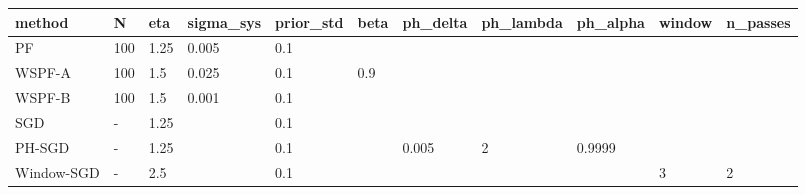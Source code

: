 \begin{tabular}{lllllllllll}
\hline
method & N & eta & sigma\_sys & prior\_std & beta & ph\_delta & ph\_lambda & ph\_alpha & window & n\_passes \\
\hline
PF & 100 & 1.25 & 0.005 & 0.1 &  &  &  &  &  &  \\
WSPF-A & 100 & 1.5 & 0.025 & 0.1 & 0.9 &  &  &  &  &  \\
WSPF-B & 100 & 1.5 & 0.001 & 0.1 &  &  &  &  &  &  \\
SGD & - & 1.25 &  & 0.1 &  &  &  &  &  &  \\
PH-SGD & - & 1.25 &  & 0.1 &  & 0.005 & 2 & 0.9999 &  &  \\
Window-SGD & - & 2.5 &  & 0.1 &  &  &  &  & 3 & 2 \\
\hline
\end{tabular}

